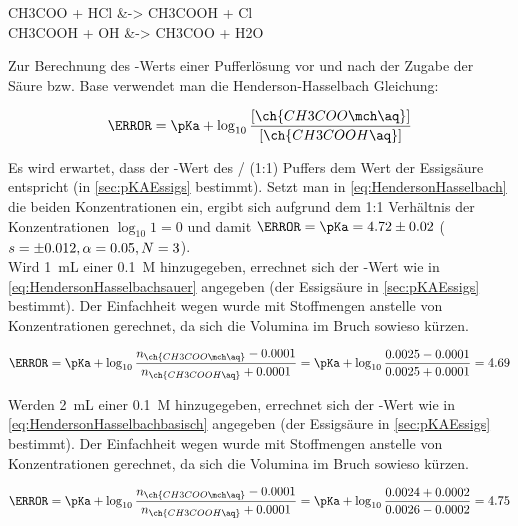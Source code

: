 \documentclass{article}
\begin{document}
      \begin{reactions}
        CH3COO\mch\aq{} + HCl\aq{} &-> CH3COOH\aq{} + Cl\mch\aq{} \label{rec:Protonenzugabe} \\
        CH3COOH\aq{} + OH\mch\aq{} &-> CH3COO\mch\aq{} + H2O 
      \end{reactions} 
      
      Zur Berechnung des \pH-Werts einer Pufferlösung vor und nach der Zugabe der Säure bzw. Base verwendet man die Henderson-Hasselbach Gleichung:
      
      \begin{equation}
        \pH = \pKa + \log _{10} \frac{[\ch{CH3COO\mch\aq}]}{[\ch{CH3COOH\aq}]} \label{eq:HendersonHasselbach}
      \end{equation}
      
      Es wird erwartet, dass der \pH-Wert des / (1:1) Puffers dem \pKa Wert der Essigsäure entspricht (in \ref{sec:pKAEssigs} bestimmt). Setzt man in \eqref{eq:HendersonHasselbach} die beiden Konzentrationen ein, ergibt sich aufgrund dem 1:1 Verhältnis der Konzentrationen $\log _{10} 1 = 0$ und damit $\pH = \pKa = \num[separate-uncertainty]{4.72 \pm 0.02}$ ($s = \num{\pm 0.012},\alpha = 0.05, N = 3$). \\
      
      Wird \SI[mode=text]{1}{\milli\liter} einer \SI[mode=text]{0.1}{M}  hinzugegeben, errechnet sich der \pH-Wert wie in \eqref{eq:HendersonHasselbachsauer} angegeben (\pKa der Essigsäure in \ref{sec:pKAEssigs} bestimmt). Der Einfachheit wegen wurde mit Stoffmengen anstelle von Konzentrationen gerechnet, da sich die Volumina im Bruch sowieso kürzen.
      
      \begin{equation}
        \pH = \pKa + \log _{10} \frac{n_{\ch{CH3COO\mch\aq}} - 0.0001}{n_{\ch{CH3COOH\aq}} + 0.0001} = \pKa + \log _{10} \frac{0.0025 - 0.0001}{0.0025 + 0.0001} = 4.69 \label{eq:HendersonHasselbachsauer}
      \end{equation}
      
      Werden \SI[mode=text]{2}{\milli\liter} einer \SI[mode=text]{0.1}{M}  hinzugegeben, errechnet sich der \pH-Wert wie in \eqref{eq:HendersonHasselbachbasisch} angegeben (\pKa der Essigsäure in \ref{sec:pKAEssigs} bestimmt). Der Einfachheit wegen wurde mit Stoffmengen anstelle von Konzentrationen gerechnet, da sich die Volumina im Bruch sowieso kürzen.
      
      \begin{equation}
        \pH = \pKa + \log _{10} \frac{n_{\ch{CH3COO\mch\aq}} - 0.0001}{n_{\ch{CH3COOH\aq}} + 0.0001} = \pKa + \log _{10} \frac{0.0024 + 0.0002}{0.0026 - 0.0002} = 4.75 \label{eq:HendersonHasselbachbasisch}
      \end{equation}
      
\end{document}
